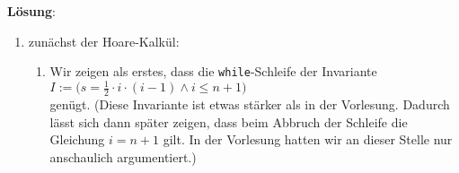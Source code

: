 \documentclass{article}
\renewcommand{\labelenumii}{\arabic{enumii}.}
\begin{document}
\noindent
\textbf{L\"osung}:
\begin{enumerate}
\item zun\"achst der Hoare-Kalk\"ul:
\begin{enumerate}
      \renewcommand{\labelenumii}{\arabic{enumii}.}
\item Wir zeigen als erstes, dass die \texttt{while}-Schleife der Invariante 
      \\[0.2cm]
      \hspace*{1.3cm}
      $I := \bigl(s = \frac{1}{2} \cdot i \cdot (i - 1) \wedge i \leq n + 1\bigr)$ 
      \\[0.2cm]
      gen\"ugt.  (Diese Invariante ist etwas st\"arker als in der Vorlesung.
      Dadurch l\"asst sich dann sp\"ater zeigen, dass beim Abbruch der Schleife
      die Gleichung $i = n+1$ gilt.  In der Vorlesung hatten wir an dieser Stelle nur
      anschaulich argumentiert.)


\end{enumerate}
\end{enumerate}
\end{document}
